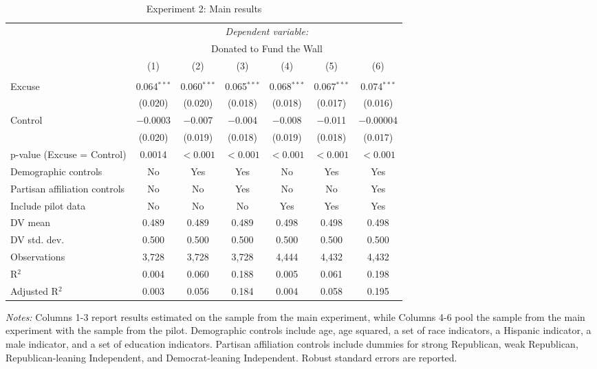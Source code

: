 
\begin{table}[!htbp] \centering 
  \caption{Experiment 2: Main results} 
  \label{t:2-main} 
\begin{threeparttable}
\begin{tabular}{@{\hspace{5pt}}l@{\hspace{5pt}}cccccc} 
\toprule 
 & \multicolumn{6}{c}{\textit{Dependent variable:}} \\ 
\cmidrule(rr){2-7} 
 & \multicolumn{6}{c}{Donated to Fund the Wall} \\ 
 \cmidrule(rr){2-7}
 & (1) & (2) & (3) & (4) & (5) & (6)\\ 
\midrule  
\\[-2.1ex] Excuse & 0.064$^{***}$ & 0.060$^{***}$ & 0.065$^{***}$ & 0.068$^{***}$ & 0.067$^{***}$ & 0.074$^{***}$ \\ 
  & (0.020) & (0.020) & (0.018) & (0.018) & (0.017) & (0.016) \\ 
 \addlinespace 
 Control & $-$0.0003 & $-$0.007 & $-$0.004 & $-$0.008 & $-$0.011 & $-$0.00004 \\ 
  & (0.020) & (0.019) & (0.018) & (0.019) & (0.018) & (0.017) \\ 
 \addlinespace 
p-value (Excuse = Control) & 0.0014 & $<0.001$ & $<0.001$ & $<0.001$ & $<0.001$ & $<0.001$ \\ 
\midrule  
Demographic controls & No & Yes & Yes & No & Yes & Yes \\ 
Partisan affiliation controls & No & No & Yes & No & No & Yes \\ 
\midrule
Include pilot data & No & No & No & Yes & Yes & Yes \\
\addlinespace
DV mean & 0.489 & 0.489 & 0.489 & 0.498 & 0.498 & 0.498 \\
DV std. dev. & 0.500 & 0.500 & 0.500 & 0.500 & 0.500 & 0.500 \\
Observations & 3,728 & 3,728 & 3,728 & 4,444 & 4,432 & 4,432 \\ 
R$^{2}$ & 0.004 & 0.060 & 0.188 & 0.005 & 0.061 & 0.198 \\ 
Adjusted R$^{2}$ & 0.003 & 0.056 & 0.184 & 0.004 & 0.058 & 0.195 \\ 
\bottomrule 
\end{tabular} 
\begin{tablenotes}
\footnotesize
\item \textit{Notes:} Columns 1-3 report results estimated on the sample from the main experiment, while Columns 4-6 pool the sample from the main experiment with the sample from the pilot. Demographic controls include age, age squared, a set of race indicators, a Hispanic indicator, a male indicator, and a set of education indicators. Partisan affiliation controls include dummies for strong Republican, weak Republican, Republican-leaning Independent, and Democrat-leaning Independent. Robust standard errors are reported.
\end{tablenotes}
\end{threeparttable}
\end{table} 
